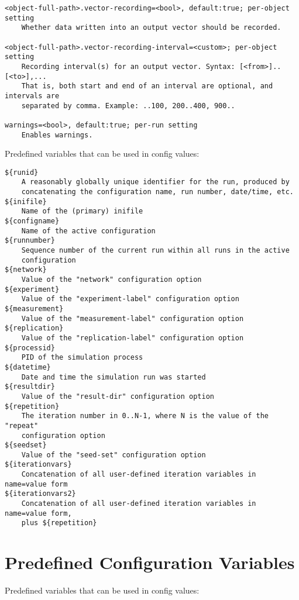 \begin{verbatim}
<object-full-path>.vector-recording=<bool>, default:true; per-object setting
    Whether data written into an output vector should be recorded.

<object-full-path>.vector-recording-interval=<custom>; per-object setting
    Recording interval(s) for an output vector. Syntax: [<from>]..[<to>],...
    That is, both start and end of an interval are optional, and intervals are
    separated by comma. Example: ..100, 200..400, 900..

warnings=<bool>, default:true; per-run setting
    Enables warnings.
\end{verbatim}


Predefined variables that can be used in config values:

\begin{verbatim}
${runid}
    A reasonably globally unique identifier for the run, produced by
    concatenating the configuration name, run number, date/time, etc.
${inifile}
    Name of the (primary) inifile
${configname}
    Name of the active configuration
${runnumber}
    Sequence number of the current run within all runs in the active
    configuration
${network}
    Value of the "network" configuration option
${experiment}
    Value of the "experiment-label" configuration option
${measurement}
    Value of the "measurement-label" configuration option
${replication}
    Value of the "replication-label" configuration option
${processid}
    PID of the simulation process
${datetime}
    Date and time the simulation run was started
${resultdir}
    Value of the "result-dir" configuration option
${repetition}
    The iteration number in 0..N-1, where N is the value of the "repeat"
    configuration option
${seedset}
    Value of the "seed-set" configuration option
${iterationvars}
    Concatenation of all user-defined iteration variables in name=value form
${iterationvars2}
    Concatenation of all user-defined iteration variables in name=value form,
    plus ${repetition}
\end{verbatim}



\section{Predefined Configuration Variables}

Predefined variables that can be used in config values:

